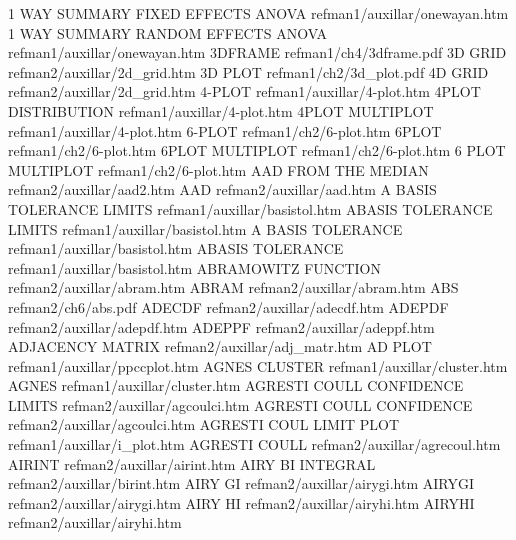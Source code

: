 1 WAY SUMMARY FIXED EFFECTS ANOVA       refman1/auxillar/onewayan.htm
1 WAY SUMMARY RANDOM EFFECTS ANOVA      refman1/auxillar/onewayan.htm
3DFRAME                                 refman1/ch4/3dframe.pdf
3D GRID                                 refman2/auxillar/2d_grid.htm
3D PLOT                                 refman1/ch2/3d_plot.pdf
4D GRID                                 refman2/auxillar/2d_grid.htm
4-PLOT                                  refman1/auxillar/4-plot.htm
4PLOT DISTRIBUTION                      refman1/auxillar/4-plot.htm
4PLOT MULTIPLOT                         refman1/auxillar/4-plot.htm
6-PLOT                                  refman1/ch2/6-plot.htm
6PLOT                                   refman1/ch2/6-plot.htm
6PLOT MULTIPLOT                         refman1/ch2/6-plot.htm
6 PLOT MULTIPLOT                        refman1/ch2/6-plot.htm
AAD FROM THE MEDIAN                     refman2/auxillar/aad2.htm
AAD                                     refman2/auxillar/aad.htm
A BASIS TOLERANCE LIMITS                refman1/auxillar/basistol.htm
ABASIS TOLERANCE LIMITS                 refman1/auxillar/basistol.htm
A BASIS TOLERANCE                       refman1/auxillar/basistol.htm
ABASIS TOLERANCE                        refman1/auxillar/basistol.htm
ABRAMOWITZ FUNCTION                     refman2/auxillar/abram.htm
ABRAM                                   refman2/auxillar/abram.htm
ABS                                     refman2/ch6/abs.pdf
ADECDF                                  refman2/auxillar/adecdf.htm
ADEPDF                                  refman2/auxillar/adepdf.htm
ADEPPF                                  refman2/auxillar/adeppf.htm
ADJACENCY MATRIX                        refman2/auxillar/adj_matr.htm
AD PLOT                                 refman1/auxillar/ppccplot.htm
AGNES CLUSTER                           refman1/auxillar/cluster.htm
AGNES                                   refman1/auxillar/cluster.htm
AGRESTI COULL CONFIDENCE LIMITS         refman2/auxillar/agcoulci.htm
AGRESTI COULL CONFIDENCE                refman2/auxillar/agcoulci.htm
AGRESTI COUL LIMIT PLOT                 refman1/auxillar/i_plot.htm
AGRESTI COULL                           refman2/auxillar/agrecoul.htm
AIRINT                                  refman2/auxillar/airint.htm
AIRY BI INTEGRAL                        refman2/auxillar/birint.htm
AIRY GI                                 refman2/auxillar/airygi.htm
AIRYGI                                  refman2/auxillar/airygi.htm
AIRY HI                                 refman2/auxillar/airyhi.htm
AIRYHI                                  refman2/auxillar/airyhi.htm
